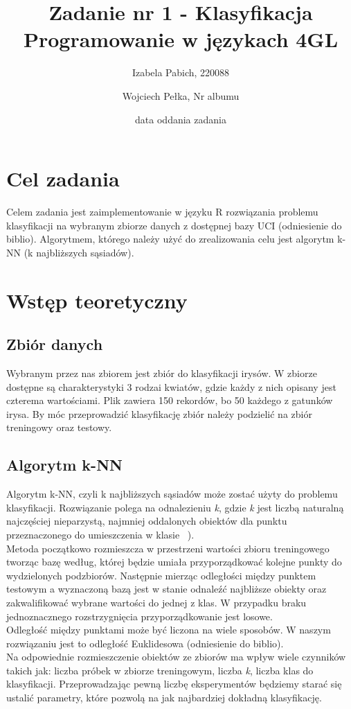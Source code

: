 \documentclass[12pt]{article}
\title{{\bf Zadanie nr 1 - Klasyfikacja}\linebreak
Programowanie w językach 4GL}
\author{Izabela Pabich, 220088 \and Wojciech Pełka, Nr albumu}
\date{data oddania zadania}
\begin{document}
\clearpage\maketitle
\thispagestyle{empty}
\newpage
\setcounter{page}{1}
\section{Cel zadania}

Celem zadania jest zaimplementowanie w języku R rozwiązania problemu klasyfikacji na wybranym zbiorze danych z dostępnej bazy UCI (odniesienie do biblio). Algorytmem, którego należy użyć do zrealizowania celu jest algorytm k-NN (k najbliższych sąsiadów). \\

\section{Wstęp teoretyczny}

\subsection{Zbiór danych}
Wybranym przez nas zbiorem jest zbiór do klasyfikacji irysów. W zbiorze dostępne są charakterystyki 3 rodzai kwiatów, gdzie każdy z nich opisany jest czterema wartościami. Plik zawiera 150 rekordów, bo 50 każdego z gatunków irysa. By móc przeprowadzić klasyfikację zbiór należy podzielić na zbiór treningowy oraz testowy. \\

\subsection{Algorytm k-NN}
Algorytm k-NN, czyli k najbliższych sąsiadów może zostać użyty do problemu klasyfikacji. Rozwiązanie polega na odnalezieniu \textit{k}, gdzie \textit{k} jest liczbą naturalną najczęściej nieparzystą, najmniej oddalonych obiektów dla punktu przeznaczonego do umieszczenia w klasie ~\cite{dowolna_etykieta_ksiazki}). \\
Metoda początkowo rozmieszcza w przestrzeni wartości zbioru treningowego tworząc bazę według, której będzie umiała przyporządkować kolejne punkty do wydzielonych podzbiorów. Następnie mierząc odległości między punktem testowym a wyznaczoną bazą jest w stanie odnaleźć najbliższe obiekty oraz zakwalifikować wybrane wartości do jednej z klas. W przypadku braku jednoznacznego rozstrzygnięcia przyporządkowanie jest losowe. \\
Odległość między punktami może być liczona na wiele sposobów. W naszym rozwiązaniu jest to odległość Euklidesowa (odniesienie do biblio). \\
Na odpowiednie rozmieszczenie obiektów ze zbiorów ma wpływ wiele czynników takich jak: liczba próbek w zbiorze treningowym, liczba \textit{k}, liczba klas do klasyfikacji. Przeprowadzając pewną liczbę eksperymentów będziemy starać się ustalić parametry, które pozwolą na jak najbardziej dokładną klasyfikację.
\end{document}
